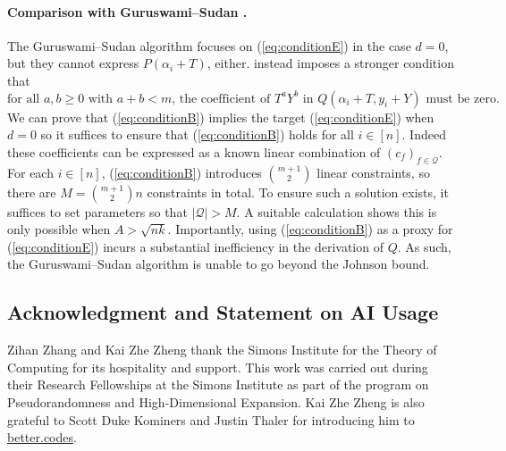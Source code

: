 \documentclass[11pt]{article}
\begin{document}
\paragraph{Comparison with Guruswami--Sudan \cite{GuruswamiSudan1999}.}The Guruswami--Sudan algorithm \cite{GuruswamiSudan1999} focuses on  (\ref{eq:conditionE}) in the case $d=0$, but they cannot express $P(\alpha_i+T)$, either. \cite{GuruswamiSudan1999} instead imposes a stronger condition that
\begin{equation}\label{eq:conditionB}
\text{for all $a, b \ge 0$ with $a + b < m$, the coefficient of $T^aY^b$ in $Q(\alpha_i+T, y_i+Y)$ must be zero.}
\end{equation}
We can prove that (\ref{eq:conditionB}) implies the target (\ref{eq:conditionE}) when $d=0$ so it suffices to ensure that (\ref{eq:conditionB}) holds for all $i\in[n]$. Indeed these coefficients can be expressed as a known linear combination of $(c_f)_{f\in\mathcal{Q}}$. For each $i\in[n]$, (\ref{eq:conditionB}) introduces $\binom{m+1}{2}$ linear constraints, so there are $M=\binom{m+1}{2}n$ constraints in total. To ensure such a solution exists, it suffices to set parameters so that $|\mathcal{Q}|>M$. A suitable calculation shows this is only possible when $A>\sqrt{nk}$. Importantly, using (\ref{eq:conditionB}) as a proxy for (\ref{eq:conditionE}) incurs a substantial inefficiency in the derivation of $Q$. As such, the Guruswami--Sudan algorithm is unable to go beyond the Johnson bound.


\subsection*{Acknowledgment and Statement on AI Usage}
Zihan Zhang and Kai Zhe Zheng thank the Simons Institute for the Theory of
Computing for its hospitality and support. This work was carried out
during their Research Fellowships at the Simons Institute as part of the
program on Pseudorandomness and High-Dimensional Expansion. Kai Zhe Zheng is also grateful to Scott Duke Kominers and Justin Thaler for introducing him to \url{better.codes}.
\end{document}
